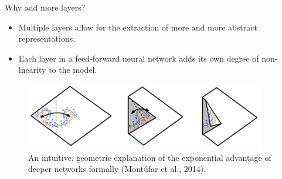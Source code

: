 \begin{vbframe}{Why add more layers?}
\begin{itemize}
\item Multiple layers allow for the extraction of more and more abstract
representations.
\item Each layer in a feed-forward neural network adds its own degree of non-lnearity to the model.
\end{itemize}
\begin{figure}
\centering
\includegraphics[width=10.5cm]{figure/folding}
\caption{An intuitive, geometric explanation of the exponential advantage of deeper networks formally (Mont\'{u}far et al., 2014).}
\end{figure}
\end{vbframe}

